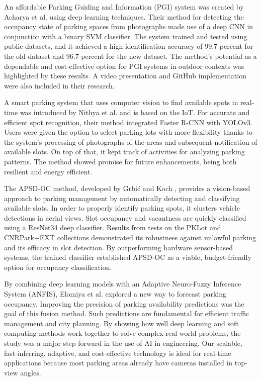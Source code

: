 \documentclass[conference]{IEEEtran}
\begin{document}
An affordable Parking Guiding and Information (PGI) system was created by Acharya et al. \cite{acharya2018real} using deep learning techniques. Their method for detecting the occupancy state of parking spaces from photographs made use of a deep CNN in conjunction with a binary SVM classifier. The system trained and tested using public datasets, and it achieved a high identification accuracy of 99.7 percent for the old dataset and 96.7 percent for the new dataset. The method's potential as a dependable and cost-effective option for PGI systems in outdoor contexts was highlighted by these results. A video presentation and GitHub implementation were also included in their research.

A smart parking system that uses computer vision to find available spots in real-time was introduced by Nithya et al. \cite{nithya2022smart} and is based on the IoT. For accurate and efficient spot recognition, their method integrated Faster R-CNN with YOLOv3. Users were given the option to select parking lots with more flexibility thanks to the system's processing of photographs of the areas and subsequent notification of available slots. On top of that, it kept track of activities for analyzing parking patterns. The method showed promise for future enhancements, being both resilient and energy efficient.

The APSD-OC method, developed by Grbić and Koch \cite{grbic2023automatic}, provides a vision-based approach to parking management by automatically detecting and classifying available slots. In order to properly identify parking spots, it clusters vehicle detections in aerial views. Slot occupancy and vacantness are quickly classified using a ResNet34 deep classifier. Results from tests on the PKLot and CNRPark+EXT collections demonstrated its robustness against unlawful parking and its efficacy in slot detection. By outperforming hardware sensor-based systems, the trained classifier established APSD-OC as a viable, budget-friendly option for occupancy classification.

By combining deep learning models with an Adaptive Neuro-Fuzzy Inference System (ANFIS), Elomiya et al. \cite{elomiya2024enhanced} explored a new way to forecast parking occupancy. Improving the precision of parking availability predictions was the goal of this fusion method. Such predictions are fundamental for efficient traffic management and city planning. By showing how well deep learning and soft computing methods work together to solve complex real-world problems, the study was a major step forward in the use of AI in engineering. Our scalable, fast-inferring, adaptive, and cost-effective technology is ideal for real-time applications because most parking areas already have cameras installed in top-view angles.
\end{document}
